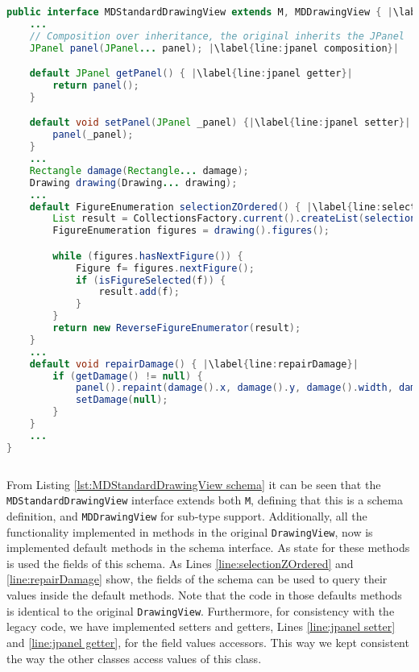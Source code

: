 \begin{sourcecode}[H]
	\begin{lstlisting}[language=Java, escapechar=|]
public interface MDStandardDrawingView extends M, MDDrawingView { |\label{line:MDStandardDrawingView extends M, MDDrawingView}|
	...
	// Composition over inheritance, the original inherits the JPanel
	JPanel panel(JPanel... panel); |\label{line:jpanel composition}|

	default JPanel getPanel() { |\label{line:jpanel getter}|
	    return panel();
	}

	default void setPanel(JPanel _panel) {|\label{line:jpanel setter}|
	    panel(_panel);
	}
	...
	Rectangle damage(Rectangle... damage);
	Drawing drawing(Drawing... drawing);
	...
	default FigureEnumeration selectionZOrdered() { |\label{line:selectionZOrdered}|
		List result = CollectionsFactory.current().createList(selectionCount());
		FigureEnumeration figures = drawing().figures();

		while (figures.hasNextFigure()) {
			Figure f= figures.nextFigure();
			if (isFigureSelected(f)) {
				result.add(f);
			}
		}
		return new ReverseFigureEnumerator(result);
	}
	...
	default void repairDamage() { |\label{line:repairDamage}|
		if (getDamage() != null) {
			panel().repaint(damage().x, damage().y, damage().width, damage().height);
			setDamage(null);
		}
	}
	...
}
	\end{lstlisting}
	\caption{MDStandardDrawingView schema}
	\label{lst:MDStandardDrawingView schema}
\end{sourcecode}

From Listing \ref{lst:MDStandardDrawingView schema} it can be seen that the \texttt{MDStandardDrawingView} interface extends both \texttt{M}, defining that this is a schema definition, and \texttt{MDDrawingView} for sub-type support.
Additionally, all the functionality implemented in methods in the original \texttt{DrawingView}, now is implemented default methods in the schema interface.
As state for these methods is used the fields of this schema.
As Lines \ref{line:selectionZOrdered} and \ref{line:repairDamage} show, the fields of the schema can be used to query their values inside the default methods.
Note that the code in those defaults methods is identical to the original \texttt{DrawingView}.
Furthermore, for consistency with the legacy code, we have implemented setters and getters, Lines \ref{line:jpanel setter} and \ref{line:jpanel getter}, for the field values accessors.
This way we kept consistent the way the other classes access values of this class.

